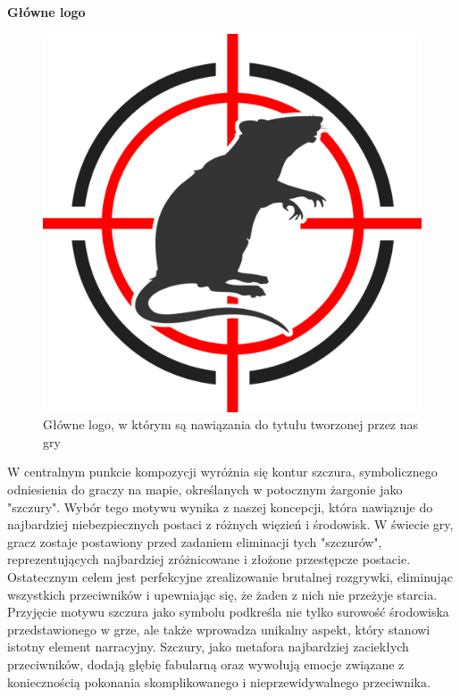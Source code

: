 \begin{center}
{\bfseries Główne logo}
\end{center}
\begin{figure}[h]
    \centering
    \includegraphics[scale=15]{Images/logo.png}
    \caption{Główne logo, w którym są nawiązania do tytułu tworzonej przez nas gry}
    \label{fig:visBuglist}
\end{figure}
\FloatBarrier

W centralnym punkcie kompozycji wyróżnia się kontur szczura, symbolicznego odniesienia do graczy na mapie, określanych w potocznym żargonie jako "szczury". Wybór tego motywu wynika z naszej koncepcji, która nawiązuje do najbardziej niebezpiecznych postaci z różnych więzień i środowisk. W świecie gry, gracz zostaje postawiony przed zadaniem eliminacji tych "szczurów", reprezentujących najbardziej zróżnicowane i złożone przestępcze postacie. Ostatecznym celem jest perfekcyjne zrealizowanie brutalnej rozgrywki, eliminując wszystkich przeciwników i upewniając się, że żaden z nich nie przeżyje starcia.
Przyjęcie motywu szczura jako symbolu podkreśla nie tylko surowość środowiska przedstawionego w grze, ale także wprowadza unikalny aspekt, który stanowi istotny element narracyjny. Szczury, jako metafora najbardziej zaciekłych przeciwników, dodają głębię fabularną oraz wywołują emocje związane z koniecznością pokonania skomplikowanego i nieprzewidywalnego przeciwnika.

